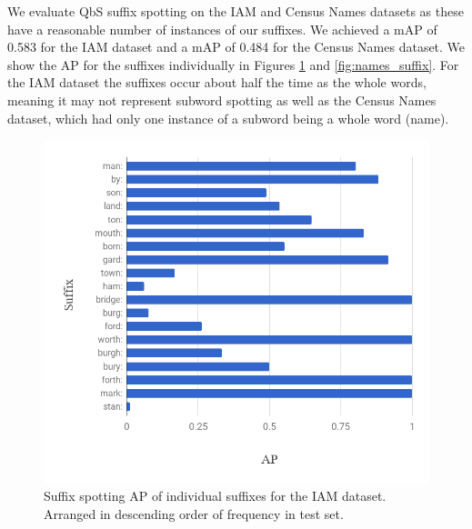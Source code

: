 \documentclass[ms,electronic,twosidetoc,letterpaper,chaptercenter,parttop,lof,lot]{byumsphd}
\begin{document}
We evaluate QbS suffix spotting on the IAM and Census Names datasets as these have a reasonable number of instances of our suffixes. We achieved a mAP of 0.583 for the IAM dataset and a mAP of 0.484 for the Census Names dataset. We show the AP for the suffixes individually in Figures \ref{fig:IAM_suffix} and \ref{fig:names_suffix}. 
For the IAM dataset the suffixes occur about half the time as the whole words, meaning it may not represent subword spotting as well as the Census Names dataset, which had only one instance of a subword being a whole word (name).




\begin{figure}
    \centering
    \includegraphics[width=.75\textwidth]{suffix_IAM_ap}
    \caption{Suffix spotting AP of individual suffixes for the IAM dataset. Arranged in descending order of frequency in test set.}
    \label{fig:IAM_suffix}
\end{figure}
\end{document}
